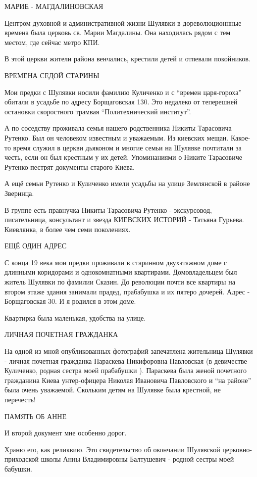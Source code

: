 МАРИЕ - МАГДАЛИНОВСКАЯ

Центром духовной и административной жизни Шулявки в дореволюционнные времена
была церковь св. Марии Магдалины. Она находилась рядом с тем местом, где сейчас
метро КПИ.

В этой церкви жители района венчались, крестили детей и отпевали покойников.

ВРЕМЕНА СЕДОЙ СТАРИНЫ

Мои предки с Шулявки носили фамилию Куличенко и с \enquote{времен царя-гороха} обитали
в усадьбе по адресу Борщаговская 130. Это недалеко от теперешней остановки
скоростного трамвая \enquote{Политехнический институт}.

А по соседству проживала семья нашего родственника Никиты Тарасовича Рутенко.
Был он человеком известным и уважаемым. Из киевских мещан. Какое-то время
служил в церкви дьяконом и многие семьи на Шулявке почтитали за честь, если он
был крестным у их детей. Упоминаниями о Никите Тарасовиче Рутенко пестрят
документы старого Киева.

А ещё семьи Рутенко и Куличенко имели усадьбы на улице Землянской в районе
Зверинца.

В группе есть правнучка Никиты Тарасовича Рутенко - экскурсовод, писательница,
консультант и звезда КИЕВСКИХ ИСТОРИЙ - Татьяна Гурьева. Киевлянка, в более чем
семи поколениях.

ЕЩЁ ОДИН АДРЕС

С конца 19 века мои предки проживали в старинном двухэтажном доме с длинными
коридорами и однокомнатными квартирами. Домовладельцем был житель Шулявки по
фамилии Сказин. До революции почти все квартиры на втором этаже здания занимали
прадед, прабабушка и их пятеро дочерей. Адрес - Борщаговская 30. И я родился в
этом доме.

Квартирка была маленькая, удобства на улице.

ЛИЧНАЯ ПОЧЕТНАЯ ГРАЖДАНКА

На одной из мной опубликованных фотографий запечатлена жительница Шулявки -
личная почетная гражданка Параскева Никифоровна Павловская (в девичестве
Куличенко, родная сестра моей прабабушки ). Параскева была женой почетного
гражданина Киева унтер-офицера Николая Ивановича Павловского и \enquote{на районе} была
очень уважаемой. Скольким детям на Шулявке была крестной, не перечесть!

ПАМЯТЬ ОБ АННЕ

И второй документ мне особенно дорог.

Храню его, как реликвию. Это свидетельство об окончании Шулявской
церковно-приходской школы Анны Владимировны Балтушевич - родной сестры моей
бабушки.

